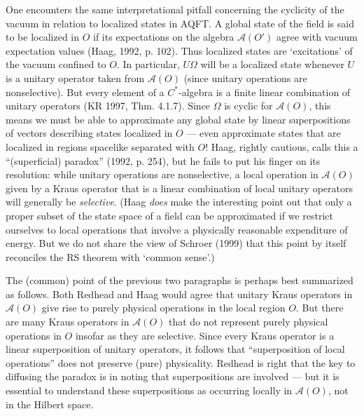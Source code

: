 \documentclass[12pt]{article}
\newcommand{\alg}[1]{\mbox{$\mathcal{#1}$}}
\begin{document}
One encounters the same interpretational pitfall concerning the cyclicity of the vacuum 
in relation to localized states in AQFT.  A global state of the 
field is said to be localized in $O$ if its expectations on the 
algebra $\alg{A}(O')$ agree with vacuum expectation values (Haag, 1992, 
p. 102).  Thus localized states are `excitations' of the vacuum 
confined to $O$.  In particular, $U\Omega$ will be a localized 
state whenever $U$ is a unitary operator taken from  
$\alg{A}(O)$ (since unitary operations are nonselective). 
But every element of a $C^{*}$-algebra is a finite linear combination of 
unitary operators (KR 1997, Thm. 4.1.7).  
Since $\Omega$ is cyclic for $\alg{A}(O)$, this means we must be able 
to approximate any global state by linear superpositions of vectors describing states 
localized in $O$ --- even approximate states that are localized in regions spacelike 
separated with $O$! Haag, 
rightly cautious, calls this 
a ``(superficial) paradox'' (1992, p. 254), but he fails to put his finger on its 
resolution: while unitary operations are 
nonselective, a local operation in $\alg{A}(O)$ given by a Kraus 
operator that is a linear combination of 
local unitary operators will generally be \emph{selective}. (Haag \emph{does} 
make the interesting point out that only a proper 
subset of 
the state space of a field can be approximated if we restrict 
ourselves to local operations that involve a physically reasonable expenditure 
of energy.  But we do not share the view of Schroer (1999) that
 this point by itself reconciles the RS theorem with 
`common sense'.)

The (common) point of the previous two paragraphs is perhaps best 
summarized as follows.  
Both Redhead and Haag would agree that unitary Kraus operators in 
$\alg{A}(O)$ give rise to purely physical 
operations in the local region $O$.  But there are many Kraus operators in $\alg{A}(O)$ that 
do not represent purely physical operations in $O$ insofar as they are 
selective.  Since every Kraus operator is a linear superposition of 
unitary operators, it follows that ``superposition of local operations'' 
does not preserve (pure) physicality.  Redhead is right that the key to 
diffusing the paradox is in noting that superpositions are 
involved --- but it is essential to understand these superpositions as 
occurring locally in 
$\alg{A}(O)$, not in the Hilbert space.     
\end{document}
